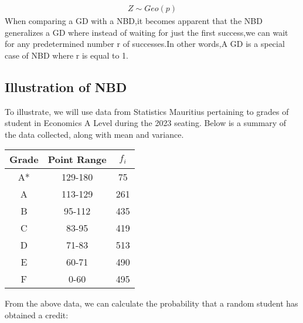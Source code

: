 \documentclass{article}
\begin{document}
\begin{gather*}
  Z \sim Geo(p)
\end{gather*}
When comparing a GD with a NBD,it becomes apparent that the NBD generalizes 
a GD where instead of waiting for just the first success,we can wait for 
any predetermined number r of successes.In other words,A GD is a special
case of NBD where r is equal to 1.

\subsection{Illustration of NBD}
To illustrate, we will use data from Statistics Mauritius pertaining
to grades of student in Economics A Level during the 2023 seating.
Below is a summary of the data collected, along with mean and 
variance.

\begin{center}
  \begin{tabular}{|c|c|c|}
    \hline
    \textbf{Grade} & \textbf{Point Range} & \textbf{$f_i$} \\ %
    \hline
    \hline
    A* & 129-180	& 75	\\ %
    A  & 113-129	& 261	\\ %
    B  & 95-112	  & 435	\\ %
    C  & 83-95	  & 419	\\ %
    D  & 71-83	  & 513	\\ %
    E  & 60-71	  & 490	\\ %
    F  & 0-60	    & 495	\\ %
    \hline
  \end{tabular}
\end{center}

From the above data, we can calculate the probability that
a random student has obtained a credit:
\end{document}
